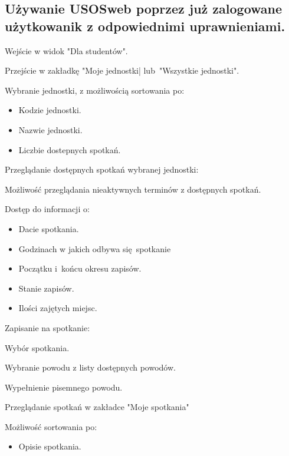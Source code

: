 \documentclass[licencjacka]{pracamgr}
\begin{document}
\subsection{Używanie USOSweb poprzez już zalogowane użytkowanik z odpowiednimi uprawnieniami.}
	\begin{step}
			\item Wejście w widok "Dla studentów".
			\item Przejście w zakładkę "Moje jednostki| lub~"Wszystkie jednostki".
			\item Wybranie jednostki, z możliwością sortowania po:
				\begin{itemize}
					\item Kodzie jednostki.
					\item Nazwie jednostki.
					\item Liczbie dostepnych spotkań. 
				\end{itemize}
			\item Przeglądanie dostępnych spotkań wybranej jednostki:
				\begin{step}
					\item Możliwość przeglądania nieaktywnych terminów z dostępnych spotkań.
					\item Dostęp do informacji o:
						\begin{itemize}
							\item Dacie spotkania.
							\item Godzinach w jakich odbywa się~spotkanie
							\item Początku i~końcu okresu zapisów.
							\item Stanie zapisów.
							\item Ilości zajętych miejsc.
						\end{itemize}
				\end{step}
			\item Zapisanie na spotkanie:
				\begin{step}
					\item Wybór spotkania.
					\item Wybranie powodu z listy dostępnych powodów.
					\item Wypełnienie pisemnego powodu.
				\end{step}
			\item Przeglądanie spotkań w zakładce "Moje spotkania"
				\begin{step}
					\item Możliwość sortowania po:
						\begin{itemize}
							\item Opisie spotkania.

\end{itemize}
\end{step}
\end{step}
\end{document}
